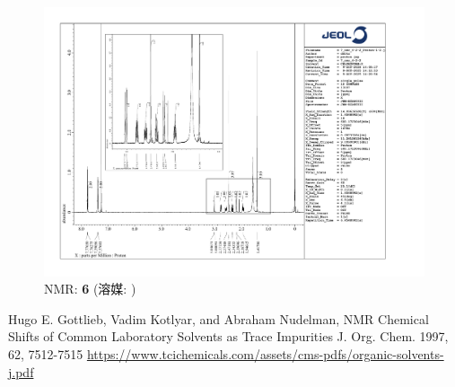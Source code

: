 \documentclass{ltjsarticle}
\theoremstyle{definition}
\numberwithin{equation}{section}
\begin{document}
\begin{figure}[htbp]
\begin{center}
\includegraphics[width = 15 cm]{NMR_6-2-2.pdf}
\caption{NMR: \textbf{6} (溶媒: )}
\label{NMR: 6-2-2}
\end{center}
\end{figure}

\begin{thebibliography}{99}
Hugo E. Gottlieb, Vadim Kotlyar, and
Abraham Nudelman, 
NMR Chemical Shifts of Common
Laboratory Solvents as Trace Impurities
J. Org. Chem. 1997, 62, 7512-7515
\url{https://www.tcichemicals.com/assets/cms-pdfs/organic-solvents-j.pdf}
\end{thebibliography}
\end{document}
